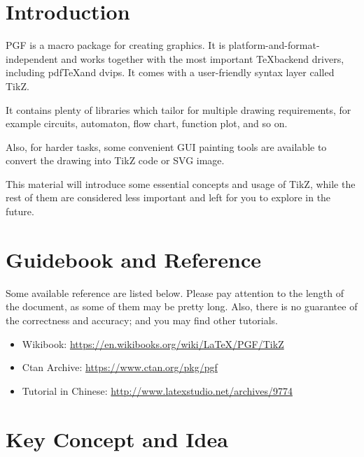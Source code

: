 \documentclass[english]{../TeXTemplate/pkupaper}
\title{\titlemark}
\author{Shlw}
\date{\today}
\begin{document}
\maketitle

\section{Introduction}

PGF is a macro pack­age for creating graphics. It is platform-and-format-independent
and works together with the most important \TeX backend drivers,
including pdf\TeX and dvips.
It comes with a user-friendly syntax layer called TikZ.\par

It contains plenty of libraries which tailor for multiple drawing requirements,
for example circuits, automaton, flow chart, function plot, and so on.\par

Also, for harder tasks, some convenient GUI painting tools are available to
convert the drawing into TikZ code or SVG image.\par

This material will introduce some essential concepts and usage of TikZ, while
the rest of them are considered less important and left for you to explore
in the future.

\section{Guidebook and  Reference}
Some available reference are listed below. Please pay attention to the 
length of the document, as some of them may be pretty long. Also, there
is no guarantee of the correctness and accuracy; and you may find other
tutorials.
\begin{itemize}
\item Wikibook: \url{https://en.wikibooks.org/wiki/LaTeX/PGF/TikZ}
\item Ctan Archive: \url{https://www.ctan.org/pkg/pgf}
\item Tutorial in Chinese: \url{http://www.latexstudio.net/archives/9774}
\end{itemize}

\section{Key Concept and Idea}
\end{document}
